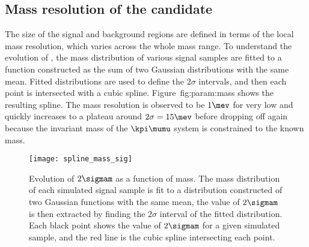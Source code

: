 
\subsection{Mass resolution of the \db candidate}
The size of the signal and background regions are defined in terms of the local mass resolution,
which varies across the whole mass range.
To understand the evolution of \sigmam, the mass distribution of various signal samples are fitted
to a function constructed as the sum of two Gaussian distributions with the same mean.
Fitted distributions are used to define the $2\sigma$ intervals, and then each point is
intersected with a cubic spline.
Figure~{fig:param:mass} shows the resulting spline.
The mass resolution is observed to be
\approx$1\mev$ for very low \mass{\db} and quickly increases to a plateau around $2\sigma=15\mev$
before dropping off again because the invariant mass of the $\kpi\mumu$ system is constrained to
the known \Bd mass.

\begin{figure}
  \begin{center}
    \texttt{[image: spline\_mass\_sig]}
    \caption[Evolution of mass resolution with \mass{\db}]
    {
      Evolution of $2\sigmam$ as a function of mass.
      The mass distribution of each simulated signal sample is fit to a distribution constructed of
      two Gaussian functions with the same mean, the value of $2\sigmam$ is then extracted by
      finding the $2\sigma$ interval of the fitted distribution.
      Each black point shows the value of $2\sigmam$ for a given simulated \btokstrdb sample, and
      the red line is the cubic spline intersecting each point.
    }
    \label{fig:param:mass}
  \end{center}
\end{figure}


